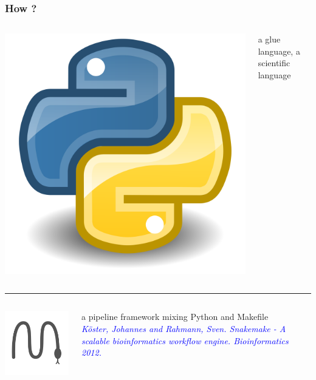 \documentclass{beamer}
\begin{document}
\begin{frame}
\frametitle{How ?}

\begin{columns}
\begin{column}{1.5cm}
\includegraphics[height=0.2\textheight]{images/logo_python.png} 
\end{column}
\begin{column}{9cm}
a glue language, a scientific language
\end{column}
\end{columns}


\rule{\textwidth}{1pt}


\begin{columns}
\begin{column}{1.5cm}
\includegraphics[height=0.2\textheight]{images/logo_snakemake.png}
\end{column}
\begin{column}{9cm}
a pipeline 
framework mixing Python and Makefile \\
{\footnotesize \textcolor{blue}{\textit{Köster, Johannes and Rahmann, Sven. 
Snakemake - A scalable 
bioinformatics workflow engine. Bioinformatics 2012.}}}
\end{column}
\end{columns}


\end{frame}
\end{document}
